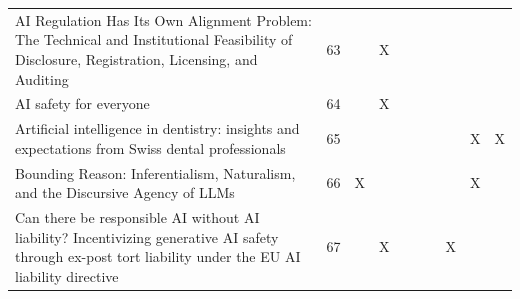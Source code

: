 \begin{landscape}
\begin{longtable}{|p{17cm}|c|c|c|c|c|c|c|c|c|}
		AI Regulation Has Its Own Alignment Problem: The Technical and Institutional Feasibility of Disclosure, Registration, Licensing, and Auditing           & 63          &                                    & X                                                         &                                                       &                                                            &                                           &                                              &                                                    &                                    \\
		AI safety for everyone                                                                                                                                  & 64          &                                    & X                                                         &                                                       &                                                            &                                           &                                              &                                                    &                                    \\
		Artificial intelligence in dentistry: insights and expectations from Swiss dental professionals                                                         & 65          &                                    &                                                           &                                                       &                                                            &                                           &                                              & X                                                  & X                                  \\
		Bounding Reason: Inferentialism, Naturalism, and the Discursive Agency of LLMs                                                                          & 66          & X                                  &                                                           &                                                       &                                                            &                                           &                                              & X                                                  &                                    \\
		Can there be responsible AI without AI liability? Incentivizing generative AI safety through ex-post tort liability under the EU AI liability directive & 67          &                                    & X                                                         &                                                       &                                                            &                                           & X                                            &                                                    &                                    \\

\end{longtable}
\end{landscape}
